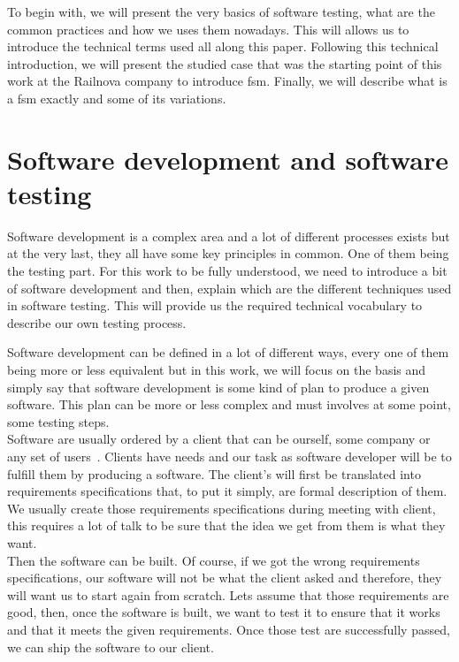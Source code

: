 \documentclass[12pt]{article}
\begin{document}
To begin with, we will present the very basics of software testing, what are the common practices and how we uses them nowadays. This will allows us to introduce the technical terms used all along this paper. Following this technical introduction, we will present the studied case that was the starting point of this work at the Railnova company to introduce \gls{fsm}. Finally, we will describe what is a \gls{fsm} exactly and some of its variations.

\clearpage
\section{Software development and software testing}

Software development is a complex area and a lot of different processes exists but at the very last, they all have some key principles in common. One of them being the testing part. For this work to be fully understood, we need to introduce a bit of software development and then, explain which are the different techniques used in software testing. This will provide us the required technical vocabulary to describe our own testing process.

Software development can be defined in a lot of different ways, every one of them being more or less equivalent but in this work, we will focus on the basis and simply say that software development is some kind of plan to produce a given software. This plan can be more or less complex and must involves at some point, some testing steps.\\

Software are usually ordered by a client that can be ourself, some company or any set of users~\cite{SoftwareDevelopment:2016}. Clients have needs and our task as software developer will be to fulfill them by producing a software. The client's will first be translated into requirements specifications that, to put it simply, are formal description of them. We usually create those requirements specifications during meeting with client, this requires a lot of talk to be sure that the idea we get from them is what they want.\\

Then the software can be built. Of course, if we got the wrong requirements specifications, our software will not be what the client asked and therefore, they will want us to start again from scratch. Lets assume that those requirements are good, then, once the software is built, we want to test it to ensure that it works and that it meets the given requirements. Once those test are successfully passed, we can ship the software to our client.\\
\end{document}
